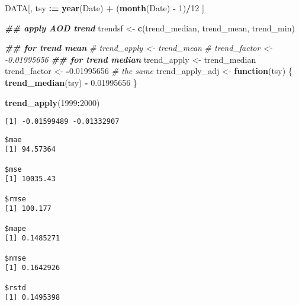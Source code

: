 \documentclass[
  10pt,
  a4paper,oneside]{article}
\newenvironment{Shaded}{\begin{snugshade}}{\end{snugshade}}
\newcommand{\CommentTok}[1]{\textcolor[rgb]{0.56,0.35,0.01}{\textit{#1}}}
\newcommand{\ControlFlowTok}[1]{\textcolor[rgb]{0.13,0.29,0.53}{\textbf{#1}}}
\newcommand{\DecValTok}[1]{\textcolor[rgb]{0.00,0.00,0.81}{#1}}
\newcommand{\DocumentationTok}[1]{\textcolor[rgb]{0.56,0.35,0.01}{\textbf{\textit{#1}}}}
\newcommand{\FloatTok}[1]{\textcolor[rgb]{0.00,0.00,0.81}{#1}}
\newcommand{\FunctionTok}[1]{\textcolor[rgb]{0.13,0.29,0.53}{\textbf{#1}}}
\newcommand{\NormalTok}[1]{#1}
\newcommand{\OtherTok}[1]{\textcolor[rgb]{0.56,0.35,0.01}{#1}}
\newcommand{\SpecialCharTok}[1]{\textcolor[rgb]{0.81,0.36,0.00}{\textbf{#1}}}
\begin{document}
\begin{Shaded}
\begin{Highlighting}[]
\NormalTok{DATA[, tsy }\SpecialCharTok{:=} \FunctionTok{year}\NormalTok{(Date) }\SpecialCharTok{+}\NormalTok{ (}\FunctionTok{month}\NormalTok{(Date) }\SpecialCharTok{{-}} \DecValTok{1}\NormalTok{)}\SpecialCharTok{/}\DecValTok{12}\NormalTok{ ]}


\DocumentationTok{\#\# apply AOD trend}
\NormalTok{trendsf }\OtherTok{\textless{}{-}} \FunctionTok{c}\NormalTok{(trend\_median, trend\_mean, trend\_min)}




\DocumentationTok{\#\# for trend mean}
\CommentTok{\# trend\_apply  \textless{}{-} trend\_mean}
\CommentTok{\# trend\_factor \textless{}{-} {-}0.01995656}
\DocumentationTok{\#\# for trend median}
\NormalTok{trend\_apply  }\OtherTok{\textless{}{-}}\NormalTok{ trend\_median}
\NormalTok{trend\_factor }\OtherTok{\textless{}{-}} \SpecialCharTok{{-}}\FloatTok{0.01995656}  \CommentTok{\# the same}
\NormalTok{trend\_apply\_adj }\OtherTok{\textless{}{-}} \ControlFlowTok{function}\NormalTok{(tsy) \{}
  \FunctionTok{trend\_median}\NormalTok{(tsy) }\SpecialCharTok{{-}} \FloatTok{0.01995656}
\NormalTok{\}}

\FunctionTok{trend\_apply}\NormalTok{(}\DecValTok{1999}\SpecialCharTok{:}\DecValTok{2000}\NormalTok{)}
\end{Highlighting}
\end{Shaded}

\begin{verbatim}
[1] -0.01599489 -0.01332907
\end{verbatim}

\begin{Shaded}
\end{Shaded}

\begin{verbatim}
$mae
[1] 94.57364

$mse
[1] 10035.43

$rmse
[1] 100.177

$mape
[1] 0.1485271

$nmse
[1] 0.1642926

$rstd
[1] 0.1495398
\end{verbatim}
\end{document}
